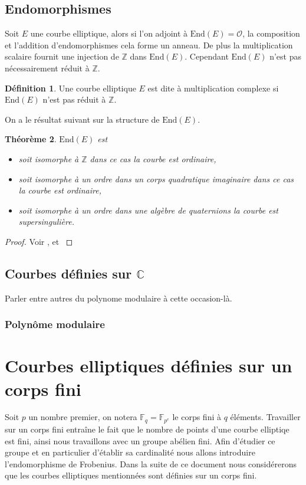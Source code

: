 \documentclass[10pt,a4paper]{book}
\theoremstyle{plain}
\newtheorem{thm}{Théorème}
\theoremstyle{definition}
\theoremstyle{definition}
\theoremstyle{definition}
\theoremstyle{definition}
\newtheorem{defi}[thm]{Définition}
\theoremstyle{remark}
\theoremstyle{remark}
\begin{document}
\subsection{Endomorphismes}

Soit $E$ une courbe elliptique, alors si l'on adjoint à $\mathrm{End}(E)=\mathcal{O}$, la composition et l'addition d'endomorphismes cela forme un anneau. De plus la multiplication scalaire fournit une injection de $\mathbb{Z}$ dans $\mathrm{End}(E)$. Cependant $\mathrm{End}(E)$ n'est pas nécessairement réduit à $\mathbb{Z}$.

\begin{defi}
Une courbe elliptique $E$ est dite à multiplication complexe si $\mathrm{End}(E)$ n'est pas réduit à $\mathbb{Z}$.
\end{defi}
On a le résultat suivant sur la structure de $\mathrm{End}(E)$.

\begin{thm}
$\mathrm{End}(E)$ est
\begin{itemize}
\item soit isomorphe à $\mathbb{Z}$ dans ce cas la courbe est \emph{ordinaire}, 
\item soit isomorphe à un ordre dans un corps quadratique imaginaire dans ce cas la courbe est \emph{ordinaire}, 
\item soit isomorphe à un ordre dans une algèbre de quaternions la courbe est \emph{supersingulière}. 
\end{itemize}
\end{thm}

\begin{proof}
Voir \cite[Corollary III.9.4]{Silv1}, et \cite[Theorem V.3.1]{Silv1}
\end{proof}

\subsection{Courbes définies sur $\mathbb{C}$}
Parler entre autres du polynome modulaire à cette occasion-là.
\subsubsection{Polynôme modulaire}


\section{Courbes elliptiques définies sur un corps fini}

Soit $p$ un nombre premier, on notera $\mathbb{F}_q=\mathbb{F}_{p^e}$ le corps fini à $q$ éléments. Travailler sur un corps fini entraîne le fait que le nombre de points d'une courbe elliptiqe est fini, ainsi nous travaillons avec un groupe abélien fini. Afin d'étudier ce groupe et en particulier d'établir sa cardinalité nous allons introduire l'endomorphisme de Frobenius. Dans la suite de ce document nous considérerons que les courbes elliptiques mentionnées sont définies sur un corps fini.
\end{document}

